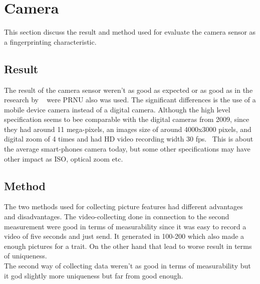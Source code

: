 \section{Camera}
This section discuss the result and method used for evaluate the camera sensor as a fingerprinting characteristic.
\subsection{Result}
The result of the camera sensor weren't as good as expected or as good as in the research by ~\cite[]{sensor:camera:DCIdent} were PRNU also was used. The significant differences is the use of a mobile device camera instead of a digital camera. Although the high level specification seems to bee comparable with the digital cameras from 2009, since they had around 11 mega-pixels, an images size of around 4000x3000 pixels, and digital zoom of 4 times and had HD video recording width 30 fps.~\cite[]{gbg:kamera} This is about the average smart-phones camera today, but some other specifications may have other impact as ISO, optical zoom etc. \\

\subsection{Method}
The two methods used for collecting picture features had different advantages and disadvantages. The video-collecting done in connection to the second measurement were good in terms of measurability since it was easy to record a video of five seconds and just send. It generated in 100-200 which also made a enough pictures for a trait. On the other hand that lead to worse result in terms of uniqueness. \\
The second way of collecting data weren't as good in terms of measurability but it god slightly more uniqueness but far from good enough.


